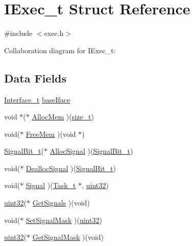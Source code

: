 \hypertarget{structIExec__t}{\section{I\+Exec\+\_\+t Struct Reference}
\label{structIExec__t}
}


{\ttfamily \#include $<$exec.\+h$>$}



Collaboration diagram for I\+Exec\+\_\+t\+:
\subsection*{Data Fields}
\begin{DoxyCompactItemize}
\item 
\hyperlink{structInterface__t}{Interface\+\_\+t} \hyperlink{structIExec__t_aa6ceae9352c17e6bdc47ec89426f7cec}{base\+Iface}
\item 
void $\ast$($\ast$ \hyperlink{structIExec__t_acd40d2c369a62c5f5a03b852665e87be}{Alloc\+Mem} )(\hyperlink{type_8h_a076233f9cef100dc0e44ff929d67d111}{size\+\_\+t})
\item 
void($\ast$ \hyperlink{structIExec__t_aeb4211f91bb1ca9cadde95d97b6b9da9}{Free\+Mem} )(void $\ast$)
\item 
\hyperlink{task_8h_a2a2b5b7da9f241ac42373a0ada8ccd0c}{Signal\+Bit\+\_\+t}($\ast$ \hyperlink{structIExec__t_a7fc67200d9bbb9be8c91910c44b9b8a2}{Alloc\+Signal} )(\hyperlink{task_8h_a2a2b5b7da9f241ac42373a0ada8ccd0c}{Signal\+Bit\+\_\+t})
\item 
void($\ast$ \hyperlink{structIExec__t_a30b70f83d842d6cb45d37543560e152d}{Dealloc\+Signal} )(\hyperlink{task_8h_a2a2b5b7da9f241ac42373a0ada8ccd0c}{Signal\+Bit\+\_\+t})
\item 
void($\ast$ \hyperlink{structIExec__t_aa70ec2222796fd3d5315fe390b7d682f}{Signal} )(\hyperlink{structTask__t}{Task\+\_\+t} $\ast$, \hyperlink{type_8h_acbd4acd0d29e2d6c43104827f77d9cd2}{uint32})
\item 
\hyperlink{type_8h_acbd4acd0d29e2d6c43104827f77d9cd2}{uint32}($\ast$ \hyperlink{structIExec__t_a3918f57891a49b6ea1e5a11aa5e3aaff}{Get\+Signals} )(void)
\item 
void($\ast$ \hyperlink{structIExec__t_aa87b8d32f626af3ceb38b1f5049592a1}{Set\+Signal\+Mask} )(\hyperlink{type_8h_acbd4acd0d29e2d6c43104827f77d9cd2}{uint32})
\item 
\hyperlink{type_8h_acbd4acd0d29e2d6c43104827f77d9cd2}{uint32}($\ast$ \hyperlink{structIExec__t_a235681278f5db353eef6777d2abd9f54}{Get\+Signal\+Mask} )(void)

\end{DoxyCompactItemize}
